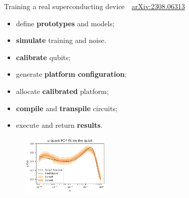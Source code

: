 \documentclass[aspectratio=169, 8pt, xcolor={svgnames}, hyperref={linkcolor=black}]{beamer}
\begin{document}
\begin{frame}{Training a real superconducting device \hfill \faBook\,\, \href{https://arxiv.org/abs/2308.06313}{arXiv:2308.06313}}

\begin{multicols}{2}
\hspace{2cm}
\begin{tcolorbox}[title=High level API: Qibo, colback=blue!20]
\begin{itemize}[noitemsep]
\small
   \item[\faCode] define \textbf{prototypes} and models;
   \item[\faCode] \textbf{simulate} training and noise.
\end{itemize}
\end{tcolorbox}
\begin{tcolorbox}[title=Calibration: Qibocal, colback=yellow!20]
\begin{itemize}[noitemsep]
\small
   \item[\faCrosshairs] \textbf{calibrate} qubits;
   \item[\faCrosshairs] generate \textbf{platform configuration};
\end{itemize}
\end{tcolorbox}
\begin{tcolorbox}[title=Execution: Qibolab, colback=red!20]
\begin{itemize}[noitemsep]
\small
   \item[\faCog] allocate \textbf{calibrated} platform;
   \item[\faCog] \textbf{compile} and \textbf{transpile} circuits;
   \item[\faCog] execute and return \textbf{results}.
\end{itemize}
\end{tcolorbox}
\begin{figure}  
    \includegraphics[width=0.38\textwidth]{figures/qpdf.pdf}
\end{figure}
\begin{center}
\begin{table}
\vspace{-0.5cm}

\end{table}
\end{center}
\end{multicols}
\end{frame}
\end{document}
